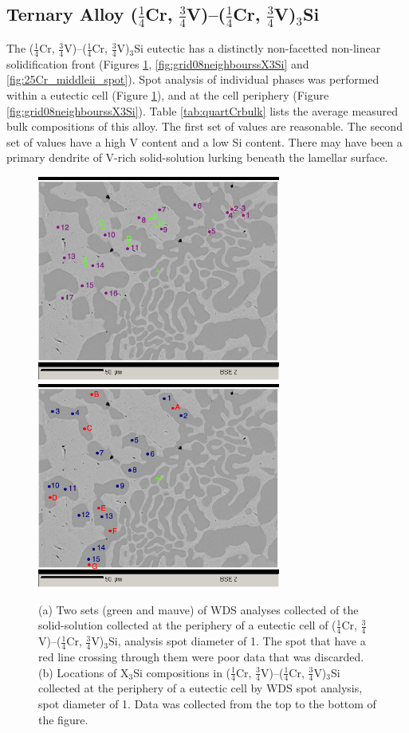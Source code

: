 \subsection{Ternary Alloy ($\frac{1}{4}$Cr, $\frac{3}{4}$V)--($\frac{1}{4}$Cr, $\frac{3}{4}$V)$_3$Si}

The ($\frac{1}{4}$Cr, $\frac{3}{4}$V)--($\frac{1}{4}$Cr, $\frac{3}{4}$V)$_3$Si eutectic has a distinctly non-facetted non-linear solidification front (Figures \ref{fig:grid08neighbouriSS}, \ref{fig:grid08neighbourssX3Si} and \ref{fig:25Cr_middleii_spot}).  Spot analysis of individual phases was performed within a eutectic cell (Figure \ref{fig:grid08neighbouriSS}), and at the cell periphery (Figure \ref{fig:grid08neighbourssX3Si}).  Table \ref{tab:quartCrbulk} lists the average measured bulk compositions of this alloy.  The first set of values are reasonable.  The second set of values have a high V content and a low Si content.  There may have been a primary dendrite of V-rich solid-solution lurking beneath the lamellar surface.  
%
\begin{figure}[H]
\begin{center}
\includegraphics[width=8cm]{grid08neighbouriSS}
\includegraphics[width=8cm]{grid07neighbouriX3Si}
\caption{(a) Two sets (green and mauve) of WDS analyses collected of the solid-solution collected at the periphery of a eutectic cell of ($\frac{1}{4}$Cr, $\frac{3}{4}$V)--($\frac{1}{4}$Cr, $\frac{3}{4}$V)$_3$Si, analysis spot diameter of 1\micro\metre.  The spot that have a red line crossing through them were poor data that was discarded. (b) Locations of X$_3$Si compositions in ($\frac{1}{4}$Cr, $\frac{3}{4}$V)--($\frac{1}{4}$Cr, $\frac{3}{4}$V)$_3$Si collected at the periphery of a eutectic cell by WDS spot analysis, spot diameter of 1\micro\metre.  Data was collected from the top to the bottom of the figure.}
\label{fig:grid08neighbouriSS}
\end{center}
\end{figure}

